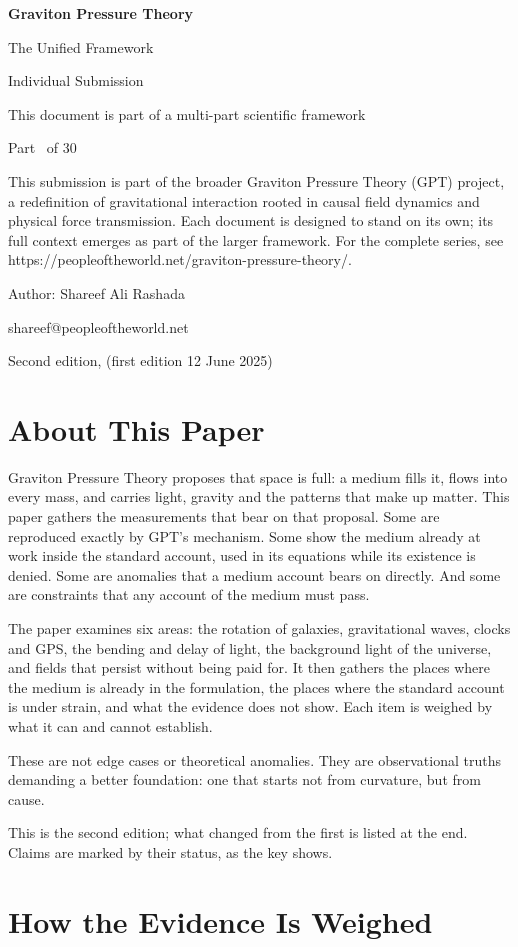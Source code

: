 \documentclass[11pt,a4paper]{article}
\makeatletter
\newcommand{\gptitle}{%
  \begin{titlepage}\centering
  \vspace*{3cm}
  {\Huge\bfseries Graviton Pressure Theory\par}\vspace{0.8cm}
  {\Large The Unified Framework\par}\vspace{0.2cm}
  {\large Individual Submission\par}\vspace{0.6cm}
  {\normalsize This document is part of a multi-part scientific framework\par}\vspace{2cm}
  {\normalsize Part \gptpart\ of 30\par}\vspace{0.8cm}
  {\huge\bfseries \gpttitle\par}\vspace{0.6cm}
  {\Large \gptsubtitle\par}\vspace{1.5cm}
  {\small\begin{minipage}{0.75\textwidth}\centering This submission is part of the broader Graviton Pressure Theory (GPT) project, a redefinition of gravitational interaction rooted in causal field dynamics and physical force transmission. Each document is designed to stand on its own; its full context emerges as part of the larger framework. For the complete series, see https://peopleoftheworld.net/graviton-pressure-theory/.\end{minipage}\par}
  \vfill
  {\large Author: Shareef Ali Rashada\par}\vspace{0.2cm}
  {\normalsize shareef@peopleoftheworld.net\par}\vspace{0.5cm}
  {\normalsize Second edition, \gptdate \quad (first edition 12 June 2025)\par}
  \end{titlepage}
  \setcounter{page}{1}\tableofcontents\clearpage}
\makeatother
\begin{document}
\gptitle

\section*{About This Paper}

Graviton Pressure Theory proposes that space is full: a medium fills it, flows into every mass, and carries light, gravity and the patterns that make up matter. This paper gathers the measurements that bear on that proposal. Some are reproduced exactly by GPT's mechanism. Some show the medium already at work inside the standard account, used in its equations while its existence is denied. Some are anomalies that a medium account bears on directly. And some are constraints that any account of the medium must pass.

The paper examines six areas: the rotation of galaxies, gravitational waves, clocks and GPS, the bending and delay of light, the background light of the universe, and fields that persist without being paid for. It then gathers the places where the medium is already in the formulation, the places where the standard account is under strain, and what the evidence does not show. Each item is weighed by what it can and cannot establish.

These are not edge cases or theoretical anomalies. They are observational truths demanding a better foundation: one that starts not from curvature, but from cause.

This is the second edition; what changed from the first is listed at the end. Claims are marked by their status, as the key shows.

\statuskey

\section{How the Evidence Is Weighed}
\end{document}
